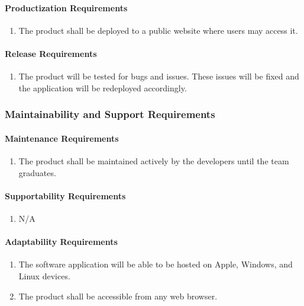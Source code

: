 \documentclass[12pt]{article}
\begin{document}
\paragraph{Productization Requirements}
\begin{enumerate}[{OE}1., leftmargin=2\parindent, resume]
    \item The product shall be deployed to a public website where users may access it.
\end{enumerate}

\paragraph{Release Requirements}
\begin{enumerate}[{OE}1., leftmargin=2\parindent, resume]
    \item The product will be tested for bugs and issues. These issues will be fixed and the application will be redeployed accordingly.
\end{enumerate}



\subsubsection{Maintainability and Support Requirements}
\label{NFR_MS}
\paragraph{Maintenance Requirements}
\begin{enumerate}[{MS}1., leftmargin=2\parindent]
    \item The product shall be maintained actively by the developers until the \progname{} team graduates.
\end{enumerate}

\paragraph{Supportability Requirements}
\begin{enumerate}[{MS}1., leftmargin=2\parindent, resume]
    \item N/A
\end{enumerate}

\paragraph{Adaptability Requirements}
\begin{enumerate}[{MS}1., leftmargin=2\parindent, resume]
    \item The software application will be able to be hosted on Apple, Windows, and Linux devices.
    \item The product shall be accessible from any web browser.
\end{enumerate}
\end{document}
